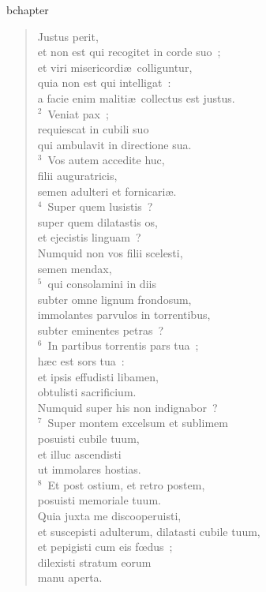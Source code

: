 bchapter\begin{verse}\vspace{-19pt}Justus perit,\\ et non est qui recogitet in corde suo~;\\ et viri misericordi\ae\ colliguntur,\\ quia non est qui intelligat~:\\ a facie enim maliti\ae\ collectus est justus.\\
${}^{2}$~Veniat pax~;\\ requiescat in cubili suo\\ qui ambulavit in directione sua.\\
${}^{3}$~Vos autem accedite huc,\\ filii auguratricis,\\ semen adulteri et fornicari\ae .\\
${}^{4}$~Super quem lusistis~?\\ super quem dilatastis os,\\ et ejecistis linguam~?\\ Numquid non vos filii scelesti,\\ semen mendax,\\
${}^{5}$~qui consolamini in diis\\ subter omne lignum frondosum,\\ immolantes parvulos in torrentibus,\\ subter eminentes petras~?\\
${}^{6}$~In partibus torrentis pars tua~;\\ h\ae c est sors tua~:\\ et ipsis effudisti libamen,\\ obtulisti sacrificium.\\ Numquid super his non indignabor~?\\
${}^{7}$~Super montem excelsum et sublimem\\ posuisti cubile tuum,\\ et illuc ascendisti\\ ut immolares hostias.\\
${}^{8}$~Et post ostium, et retro postem,\\ posuisti memoriale tuum.\\ Quia juxta me discooperuisti,\\ et suscepisti adulterum, dilatasti cubile tuum,\\ et pepigisti cum eis fœdus~;\\ dilexisti stratum eorum\\ manu aperta.\\

\end{verse}
